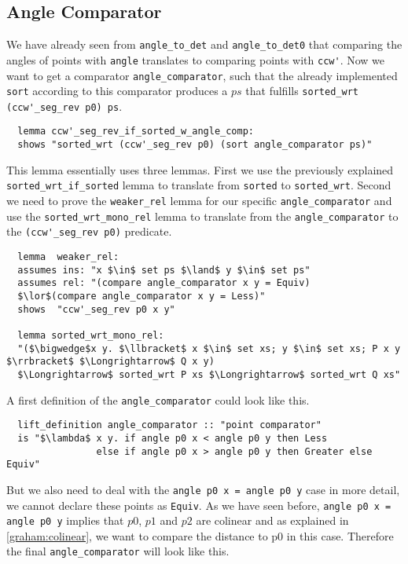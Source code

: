 \subsection{Angle Comparator}
We have already 
seen from \lstinline|angle_to_det| and \lstinline|angle_to_det0| that comparing the angles of points
with \lstinline|angle| translates to comparing points with \lstinline|ccw'|.
Now we want to get a comparator \lstinline|angle_comparator|, such that the already implemented 
\lstinline|sort| according to this 
comparator produces a $ps$ that fulfills \lstinline|sorted_wrt (ccw'_seg_rev p0) ps|.
\begin{lstlisting}
  lemma ccw'_seg_rev_if_sorted_w_angle_comp:
  shows "sorted_wrt (ccw'_seg_rev p0) (sort angle_comparator ps)"
\end{lstlisting}
This lemma essentially uses three lemmas. First we use the previously explained \lstinline|sorted_wrt_if_sorted| lemma
to translate from \lstinline|sorted| to \lstinline|sorted_wrt|. Second we need to prove the \lstinline|weaker_rel|
lemma for our specific \lstinline|angle_comparator| and use the \lstinline|sorted_wrt_mono_rel| lemma to 
translate from the \lstinline|angle_comparator| to the \lstinline|(ccw'_seg_rev p0)| predicate.
\begin{lstlisting}
  lemma  weaker_rel:
  assumes ins: "x $\in$ set ps $\land$ y $\in$ set ps"
  assumes rel: "(compare angle_comparator x y = Equiv) 
  $\lor$(compare angle_comparator x y = Less)"
  shows  "ccw'_seg_rev p0 x y"

  lemma sorted_wrt_mono_rel:
  "($\bigwedge$x y. $\llbracket$ x $\in$ set xs; y $\in$ set xs; P x y $\rrbracket$ $\Longrightarrow$ Q x y) 
  $\Longrightarrow$ sorted_wrt P xs $\Longrightarrow$ sorted_wrt Q xs"
\end{lstlisting} 
A first definition of the  \lstinline|angle_comparator| could look like this.
\begin{lstlisting}
  lift_definition angle_comparator :: "point comparator"
  is "$\lambda$ x y. if angle p0 x < angle p0 y then Less 
                else if angle p0 x > angle p0 y then Greater else Equiv"
\end{lstlisting} 
But we also need to deal with the \lstinline|angle p0 x = angle p0 y| case in more
detail, we cannot declare these points as \lstinline|Equiv|. As we have seen before, \lstinline|angle p0 x = angle p0 y| 
implies that $p0$, $p1$ and $p2$ are colinear
and as explained in \ref*{graham:colinear}, we want to compare the distance to p0 
in this case. Therefore the final \lstinline|angle_comparator| will look like this.

